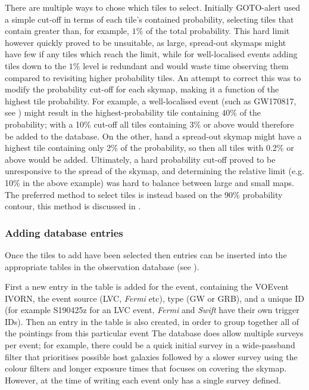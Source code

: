 \begin{colsection}
There are multiple ways to chose which tiles to select. Initially GOTO-alert used a simple cut-off in terms of each tile's contained probability, selecting tiles that contain greater than, for example, $1\%$ of the total probability. This hard limit however quickly proved to be unsuitable, as large, spread-out skymaps might have few if any tiles which reach the limit, while for well-localised events adding tiles down to the $1\%$ level is redundant and would waste time observing them compared to revisiting higher probability tiles. An attempt to correct this was to modify the probability cut-off for each skymap, making it a function of the highest tile probability. For example, a well-localised event (such as GW170817, see ) might result in the highest-probability tile containing $40\%$ of the probability; with a 10\% cut-off all tiles containing 3\% or above would therefore be added to the database. On the other, hand a spread-out skymap might have a highest tile containing only 2\% of the probability, so then all tiles with 0.2\% or above would be added. Ultimately, a hard probability cut-off proved to be unresponsive to the spread of the skymap, and determining the relative limit (e.g. 10\% in the above example) was hard to balance between large and small maps. The preferred method to select tiles is instead based on the 90\% probability contour, this method is discussed in .

\subsubsection{Adding database entries}

Once the tiles to add have been selected then entries can be inserted into the appropriate tables in the observation database (see ).

First a new entry in the  table is added for the event, containing the VOEvent IVORN, the event source (LVC, \textit{Fermi} etc), type (GW or GRB), and a unique ID (for example S190425z for an LVC event, \textit{Fermi} and \textit{Swift} have their own trigger IDs). Then an entry in the  table is also created, in order to group together all of the pointings from this particular event The database does allow multiple surveys per event; for example, there could be a quick initial survey in a wide-passband filter that prioritises possible host galaxies followed by a slower survey using the colour filters and longer exposure times that focuses on covering the skymap. However, at the time of writing each event only has a single survey defined.


\end{colsection}
